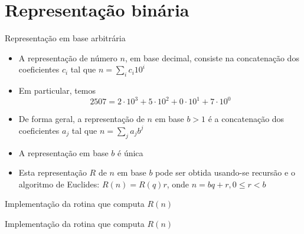 \section{Representação binária}

\begin{frame}[fragile]{Representação em base arbitrária}

    \begin{itemize}
        \item A representação de número $n$, em base decimal, consiste na concatenação dos
            coeficientes $c_i$ tal que $n = \sum_i c_i10^i$

        \item Em particular, temos 
        \[
            2507 = 2\cdot 10^3 + 5\cdot 10^2 + 0\cdot 10^1 + 7\cdot 10^0 
        \]

        \item De forma geral, a representação de $n$ em base $b > 1$ é a concatenação dos 
        coeficientes $a_j$ tal que $n = \sum_j a_jb^j$

        \item A representação em base $b$ é única

        \item Esta representação $R$ de $n$ em base $b$ pode ser obtida usando-se recursão e o 
            algoritmo de Euclides: $R(n) = R(q)r$, onde $n = bq + r, 0 \leq r < b$
    \end{itemize}

\end{frame}

\begin{frame}[fragile]{Implementação da rotina que computa $R(n)$}
\end{frame}

\begin{frame}[fragile]{Implementação da rotina que computa $R(n)$}
\end{frame}

